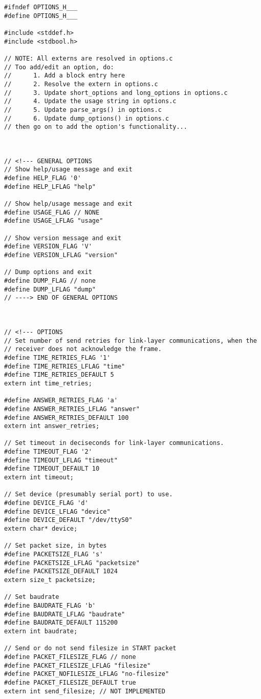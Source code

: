 \documentclass[subfiles]{main.tex}
\begin{document}
\begin{lstlisting}[style=rcom]
#ifndef OPTIONS_H___
#define OPTIONS_H___

#include <stddef.h>
#include <stdbool.h>

// NOTE: All externs are resolved in options.c
// Too add/edit an option, do:
//      1. Add a block entry here
//      2. Resolve the extern in options.c
//      3. Update short_options and long_options in options.c
//      4. Update the usage string in options.c
//      5. Update parse_args() in options.c
//      6. Update dump_options() in options.c
// then go on to add the option's functionality...



// <!--- GENERAL OPTIONS
// Show help/usage message and exit
#define HELP_FLAG '0'
#define HELP_LFLAG "help"

// Show help/usage message and exit
#define USAGE_FLAG // NONE
#define USAGE_LFLAG "usage"

// Show version message and exit
#define VERSION_FLAG 'V'
#define VERSION_LFLAG "version"

// Dump options and exit
#define DUMP_FLAG // none
#define DUMP_LFLAG "dump"
// ----> END OF GENERAL OPTIONS



// <!--- OPTIONS
// Set number of send retries for link-layer communications, when the
// receiver does not acknowledge the frame.
#define TIME_RETRIES_FLAG '1'
#define TIME_RETRIES_LFLAG "time"
#define TIME_RETRIES_DEFAULT 5
extern int time_retries;

#define ANSWER_RETRIES_FLAG 'a'
#define ANSWER_RETRIES_LFLAG "answer"
#define ANSWER_RETRIES_DEFAULT 100
extern int answer_retries;

// Set timeout in deciseconds for link-layer communications.
#define TIMEOUT_FLAG '2'
#define TIMEOUT_LFLAG "timeout"
#define TIMEOUT_DEFAULT 10
extern int timeout;

// Set device (presumably serial port) to use.
#define DEVICE_FLAG 'd'
#define DEVICE_LFLAG "device"
#define DEVICE_DEFAULT "/dev/ttyS0"
extern char* device;

// Set packet size, in bytes
#define PACKETSIZE_FLAG 's'
#define PACKETSIZE_LFLAG "packetsize"
#define PACKETSIZE_DEFAULT 1024
extern size_t packetsize;

// Set baudrate
#define BAUDRATE_FLAG 'b'
#define BAUDRATE_LFLAG "baudrate"
#define BAUDRATE_DEFAULT 115200
extern int baudrate;

// Send or do not send filesize in START packet
#define PACKET_FILESIZE_FLAG // none
#define PACKET_FILESIZE_LFLAG "filesize"
#define PACKET_NOFILESIZE_LFLAG "no-filesize"
#define PACKET_FILESIZE_DEFAULT true
extern int send_filesize; // NOT IMPLEMENTED


\end{lstlisting}
\end{document}
